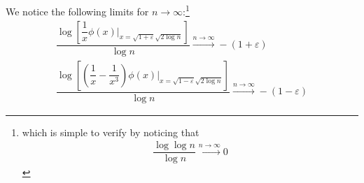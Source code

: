 \documentclass[11pt,a4paper]{article}
\numberwithin{equation}{section}%
\begin{document}
\subsection{}
We notice the following limits for $ n \to \infty $:\footnote{which is simple to verify by noticing that 
\begin{align*}
    \dfrac{ \log\log n }{ \log n } \xrightarrow[]{n\to\infty} 0 
\end{align*}

}
\begin{align*}
    \dfrac{ \log \left[ \dfrac{ 1 }{ x }\phi(x) \Big|_{x=\sqrt{1+\varepsilon }\sqrt{2\log n}} \right] }{ \log n } \xrightarrow[]{n\to\infty } -(1+\varepsilon )\tag{1}\\
    \dfrac{ \log \left[ \left(\dfrac{ 1 }{ x } - \dfrac{ 1 }{ x^3 }\right) \phi(x) \Big|_{x=\sqrt{1-\varepsilon }\sqrt{2\log n}} \right] }{ \log n }   \xrightarrow[]{n\to\infty } -(1-\varepsilon )\tag{2}
\end{align*}
\end{document}
